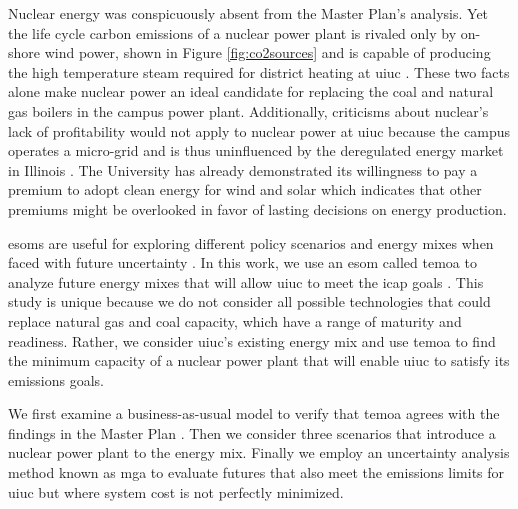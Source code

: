 Nuclear energy was conspicuously absent from the Master Plan's analysis. Yet
the life cycle carbon emissions of a nuclear power plant is rivaled only by on-
shore wind power, shown in Figure \ref{fig:co2sources} and is capable of
producing the high temperature steam required for district heating at
\gls{uiuc} \cite{allen_framing_2018}. These two facts alone make nuclear power
an ideal candidate for replacing the coal and natural gas boilers in the campus
power plant. Additionally, criticisms about nuclear's lack of profitability
would not apply to nuclear power at \gls{uiuc} because the campus operates a
micro-grid and is thus uninfluenced by the deregulated energy market in
Illinois \cite{clemmer_nuclear_2018, nian_economic_2020}. The University has
already demonstrated its willingness to pay a premium to adopt clean energy for
wind and solar
\cite{breitweiser_wind_2016,white_solar_2017,noauthor_solar_nodate} which
indicates that other premiums might be overlooked in favor of lasting decisions
on energy production.


 \glspl{esom} are useful for
exploring different policy scenarios and energy mixes when faced with future
uncertainty
\cite{decarolis_modelling_2016,hunter_modeling_2013,li_open_2020,decarolis_multi-stage_nodate}.
In this work, we use an \gls{esom} called \gls{temoa}
to analyze future energy mixes that will allow \gls{uiuc} to meet the
\gls{icap} goals \cite{decarolis_tools_2020}. This study is unique because we do
not consider all possible technologies that could replace natural gas and coal
capacity, which have a range of maturity and readiness. Rather, we
consider \gls{uiuc}'s existing energy mix and use \gls{temoa} to find the
minimum capacity of a nuclear power plant that will enable \gls{uiuc} to
satisfy its emissions goals.

We first examine a business-as-usual model to verify that \gls{temoa} agrees
with the findings in the Master Plan
\cite{affiliated_engineers_inc_utilities_2015}. Then we consider three scenarios
that introduce a nuclear power plant to the energy mix. Finally we employ an
uncertainty analysis method known as \gls{mga} to evaluate futures
that also meet the emissions limits for \gls{uiuc} but where system cost is not
perfectly minimized.
